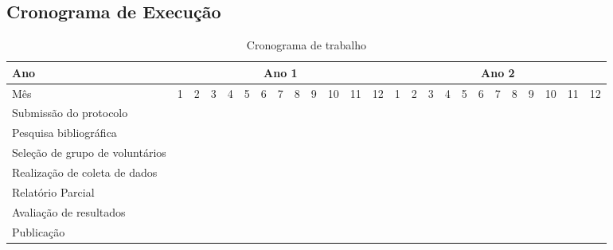 \documentclass[rascunho,xindy]{Classe-Latex-FEI/fei}
\begin{document}
\begin{landscape}

\chapter{Cronograma de Execução}

\begin{table}[ht]
  \caption{Cronograma de trabalho}
  \begin{center}
      \begin{tabular}{|l |l |l |l |l ||l |l |l |l ||l |l |l |l ||l |l |l |l ||l |l |l |l ||l |l |l |l ||}
      \hline
      Ano        & \multicolumn{12}{c||}{Ano 1} & \multicolumn{12}{c||}{Ano 2}\\
      \hline
      Mês & 1 & 2 & 3 & 4 & 5 & 6 & 7 & 8 & 9 & 10 & 11 & 12 & 1 & 2 & 3 & 4 & 5 & 6 & 7 & 8 & 9 & 10 & 11 & 12\\
      \hline
      Submissão do protocolo            & \cellcolor{black!80} & \cellcolor{black!80} & \cellcolor{black!80} & \cellcolor{black!80} &   &   &   &   &   &   &   &   &   &   &   &   &   &   &   &   &   &   &   &   \\
      Pesquisa bibliográfica            & \cellcolor{black!80} & \cellcolor{black!80} & \cellcolor{black!80} & \cellcolor{black!80} &   &   &   &   &   &   &   &   &   &   &   &   &   &   &   &   &   &   &   &   \\
      Seleção de grupo de voluntários   &   & \cellcolor{black!80} & \cellcolor{black!80} & \cellcolor{black!80} & \cellcolor{black!80} &   &   &   &   &   &   &   &   &   &   &   &   &   &   &   &   &   &   &   \\
      Realização de coleta de dados     &   &   &   & \cellcolor{black!80} & \cellcolor{black!80} & \cellcolor{black!80} &   &   &   &   &   &   &   &   &   &   &   &   &   &   &   &   &   &   \\
      Relatório Parcial                 &   &   &   & \cellcolor{black!80} & \cellcolor{black!80} & \cellcolor{black!80} & \cellcolor{black!80} &   &   &   &   &   &   &   &   &   &   &   &   &   &   &   &   &   \\
      Avaliação de resultados           &   &   &   &   & \cellcolor{black!80} & \cellcolor{black!80} & \cellcolor{black!80} & \cellcolor{black!80} & \cellcolor{black!80} &   &   &   &   &   &   &   &   &   &   &   &   &   &   &   \\ 
      Publicação                        &   &   &   &   &   & \cellcolor{black!80} & \cellcolor{black!80} & \cellcolor{black!80} & \cellcolor{black!80} &   &   &   &   &   &   &   &   &   &   &   &   &   &   &   \\

\end{tabular}
\end{center}
\end{table}
\end{landscape}
\end{document}
